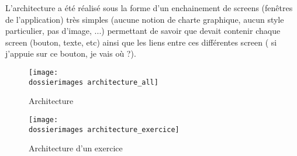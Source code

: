 L'architecture a été réalisé sous la forme d'un enchainement de screens (fenêtres de l'application) très simples (aucune notion de charte graphique, aucun style particulier, pas d'image, ...) permettant de savoir que devait contenir chaque screen (bouton, texte, etc) ainsi que les liens entre ces différentes screen (\og{} si j'appuie sur ce bouton, je vais où ?\fg{}).


\begin{figure}
	\label{architecture_all}
	\caption{Architecture}
	\centering
	\texttt{[image: \\dossierimages architecture\_all]}
\end{figure}

\begin{figure}
	\label{architecture_exercice}
	\caption{Architecture d'un exercice}
	\centering
	\texttt{[image: \\dossierimages architecture\_exercice]}
\end{figure}